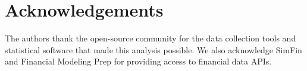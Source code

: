 \documentclass[11pt]{article}
\begin{document}
\section*{Acknowledgements}

The authors thank the open-source community for the data collection tools and statistical software that made this analysis possible. We also acknowledge SimFin and Financial Modeling Prep for providing access to financial data APIs.



\end{document}
